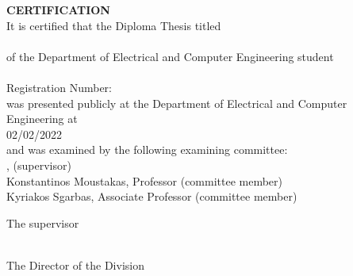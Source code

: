 \pagestyle{empty}
\begin{center}
{\LARGE \textbf{CERTIFICATION}\\[1cm]}
\large It is certified that the Diploma Thesis titled\\[1cm]
\textbf{\large \thesistitle }\\[1cm]
of the Department of Electrical and Computer Engineering student\\[1.5cm]
\textbf{\large \me }\\[0.5cm]
Registration Number: \studnum \\[1.5cm]
was presented publicly at the Department of Electrical and Computer Engineering at\\[0.5cm]
\Large{02/02/2022}\\[0.5cm]
and was examined by the following examining committee:\\[0.5cm]
\supname, \suptitle (supervisor)\\
Konstantinos Moustakas, Professor (committee member)\\
Kyriakos Sgarbas, Associate Professor (committee member)\\
\end{center}

\vfill

\begin{minipage}{0.5\textwidth}
\begin{flushleft} \large
The supervisor\\[3cm]
\supname \\
\emph{\suptitle}
\end{flushleft}
\end{minipage}
\begin{minipage}{0.5\textwidth}
\begin{flushright} \large
The Director of the Division\\[3cm]
\headofdivision\\
\emph{\headofdivisiontitle}
\end{flushright}
\end{minipage}